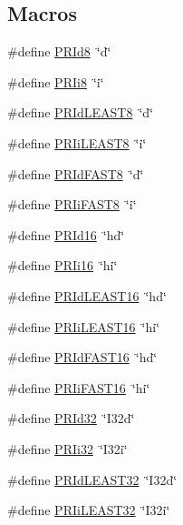 \subsection*{Macros}
\begin{DoxyCompactItemize}
\item 
\#define \hyperlink{a00113_ae53c45f590033ad1f2f517faf3ab2f1b}{P\+R\+Id8}~\char`\"{}d\char`\"{}
\item 
\#define \hyperlink{a00113_adbe02b78cca747b2fe1a8f7fc5f5cd47}{P\+R\+Ii8}~\char`\"{}i\char`\"{}
\item 
\#define \hyperlink{a00113_a404fd01f0b890cb8fac8641aaa704b57}{P\+R\+Id\+L\+E\+A\+S\+T8}~\char`\"{}d\char`\"{}
\item 
\#define \hyperlink{a00113_a526151b1725956030b501d9dd506f2e1}{P\+R\+Ii\+L\+E\+A\+S\+T8}~\char`\"{}i\char`\"{}
\item 
\#define \hyperlink{a00113_a943961b7e7e564388dd743593db5bbbb}{P\+R\+Id\+F\+A\+S\+T8}~\char`\"{}d\char`\"{}
\item 
\#define \hyperlink{a00113_a64fb4e44c3ff09179fc445979b7fdad1}{P\+R\+Ii\+F\+A\+S\+T8}~\char`\"{}i\char`\"{}
\item 
\#define \hyperlink{a00113_a087e50fe0283aacc71d7138d13e91939}{P\+R\+Id16}~\char`\"{}hd\char`\"{}
\item 
\#define \hyperlink{a00113_a655e9b358e0371a4bf5ff21cc08273e3}{P\+R\+Ii16}~\char`\"{}hi\char`\"{}
\item 
\#define \hyperlink{a00113_ae90ab00cb4417081dc68e9fd6c0e129a}{P\+R\+Id\+L\+E\+A\+S\+T16}~\char`\"{}hd\char`\"{}
\item 
\#define \hyperlink{a00113_a96945864cb2d1f7de861ccaf639af02e}{P\+R\+Ii\+L\+E\+A\+S\+T16}~\char`\"{}hi\char`\"{}
\item 
\#define \hyperlink{a00113_a58cdfb02574b8c23d964a6e88a268782}{P\+R\+Id\+F\+A\+S\+T16}~\char`\"{}hd\char`\"{}
\item 
\#define \hyperlink{a00113_ac273fb2a05215962fbeae76abaaf0131}{P\+R\+Ii\+F\+A\+S\+T16}~\char`\"{}hi\char`\"{}
\item 
\#define \hyperlink{a00113_a6d94d1417e1b35c53aee6306590de72b}{P\+R\+Id32}~\char`\"{}I32d\char`\"{}
\item 
\#define \hyperlink{a00113_ae212e57631ec729f70e0cc42e51dd91e}{P\+R\+Ii32}~\char`\"{}I32i\char`\"{}
\item 
\#define \hyperlink{a00113_ad36a6b276bd808d713cc5603ba008c58}{P\+R\+Id\+L\+E\+A\+S\+T32}~\char`\"{}I32d\char`\"{}
\item 
\#define \hyperlink{a00113_ad7a1bae7ca12c7b5415fae1b3f258207}{P\+R\+Ii\+L\+E\+A\+S\+T32}~\char`\"{}I32i\char`\"{}

\end{DoxyCompactItemize}
